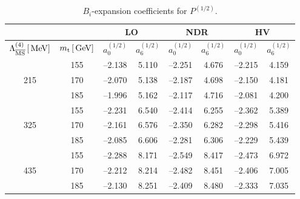 \begin{table}[htb]
\caption[]{$B_i$-expansion coefficients for $P^{(1/2)}$.
\label{tab:bip12}}
\begin{center}
\begin{tabular}{|c|c||c|c||c|c||c|c|}
& & \multicolumn{2}{c||}{LO} &
  \multicolumn{2}{c||}{NDR} &
  \multicolumn{2}{c|}{HV} \\
\hline
$\Lambda_{\overline{\rm MS}}^{(4)}\,[\, {\rm MeV}]$ & $m_{\rm t}\,[\, {\rm GeV}]$ &
$a_0^{(1/2)}$ & $a_6^{(1/2)}$ &
$a_0^{(1/2)}$ & $a_6^{(1/2)}$ &
$a_0^{(1/2)}$ & $a_6^{(1/2)}$ \\
\hline
    & 155  &  --2.138 & 5.110  &  --2.251 & 4.676  &  --2.215 & 4.159 \\
215 & 170  &  --2.070 & 5.138  &  --2.187 & 4.698  &  --2.150 & 4.181 \\
    & 185  &  --1.996 & 5.162  &  --2.117 & 4.716  &  --2.081 & 4.200 \\
\hline 
    & 155  &  --2.231 & 6.540  &  --2.414 & 6.255  &  --2.362 & 5.389 \\
325 & 170  &  --2.161 & 6.576  &  --2.350 & 6.282  &  --2.298 & 5.416 \\
    & 185  &  --2.085 & 6.606  &  --2.281 & 6.306  &  --2.229 & 5.439 \\
\hline 
    & 155  &  --2.288 & 8.171  &  --2.549 & 8.417  &  --2.473 & 6.972 \\
435 & 170  &  --2.212 & 8.214  &  --2.482 & 8.451  &  --2.406 & 7.005 \\
    & 185  &  --2.130 & 8.251  &  --2.409 & 8.480  &  --2.333 & 7.035
\end{tabular}
\end{center}
\end{table}

